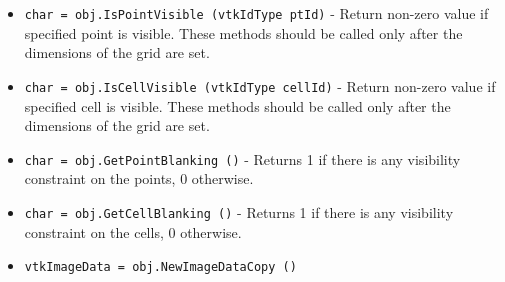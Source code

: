 \begin{itemize}
\item  \verb|char = obj.IsPointVisible (vtkIdType ptId)| -  Return non-zero value if specified point is visible.
 These methods should be called only after the dimensions of the
 grid are set.

\item  \verb|char = obj.IsCellVisible (vtkIdType cellId)| -  Return non-zero value if specified cell is visible.
 These methods should be called only after the dimensions of the
 grid are set.

\item  \verb|char = obj.GetPointBlanking ()| -  Returns 1 if there is any visibility constraint on the points,
 0 otherwise.

\item  \verb|char = obj.GetCellBlanking ()| -  Returns 1 if there is any visibility constraint on the cells,
 0 otherwise.

\item  \verb|vtkImageData = obj.NewImageDataCopy ()|

\end{itemize}
